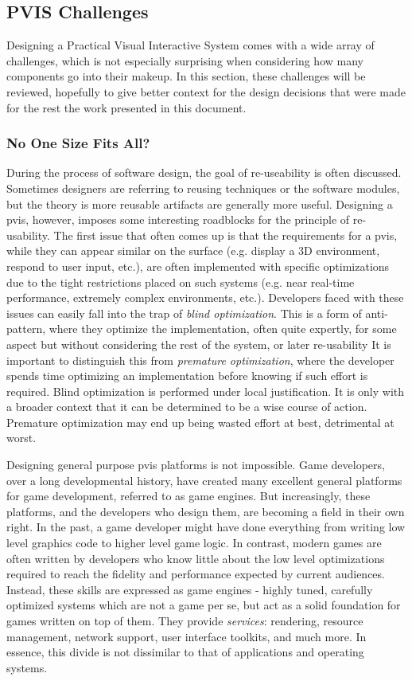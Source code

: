 \documentclass[12pt,oneside,letterpaper]{memoir}
\begin{document}
\subsection{PVIS Challenges}

Designing a Practical Visual Interactive System comes with a wide
array of challenges, which is not especially surprising when
considering how many components go into their makeup. In this section,
these challenges will be reviewed, hopefully to give better context
for the design decisions that were made for the rest the work
presented in this document.

\subsubsection{No One Size Fits All?}

During the process of software design, the goal of re-useability is
often discussed. Sometimes designers are referring to reusing
techniques or the software modules, but the theory is more reusable
artifacts are generally more useful. Designing a \gls{pvis}, however,
imposes some interesting roadblocks for the principle of
re-usability. The first issue that often comes up is that the
requirements for a \gls{pvis}, while they can appear similar on the
surface (e.g. display a 3D environment, respond to user input, etc.),
are often implemented with specific optimizations due to the tight
restrictions placed on such systems (e.g. near real-time performance,
extremely complex environments, etc.). Developers faced with these
issues can easily fall into the trap of \textit{blind
  optimization}. This is a form of anti-pattern, where they optimize
the implementation, often quite expertly, for some aspect but without
considering the rest of the system, or later re-usability It is
important to distinguish this from \textit{premature optimization},
where the developer spends time optimizing an implementation before
knowing if such effort is required. Blind optimization is performed
under local justification. It is only with a broader context that it
can be determined to be a wise course of action. Premature
optimization may end up being wasted effort at best, detrimental at
worst.

Designing general purpose \gls{pvis} platforms is not impossible. Game
developers, over a long developmental history, have created many
excellent general platforms for game development, referred to as game
engines. But increasingly, these platforms, and the developers who
design them, are becoming a field in their own right.  In the past, a
game developer might have done everything from writing low level
graphics code to higher level game logic. In contrast, modern games
are often written by developers who know little about the low level
optimizations required to reach the fidelity and performance expected
by current audiences. Instead, these skills are expressed as game
engines - highly tuned, carefully optimized systems which are not a
game per se, but act as a solid foundation for games written on top of
them. They provide \textit{services}: rendering, resource management,
network support, user interface toolkits, and much more. In essence,
this divide is not dissimilar to that of applications and operating
systems.
\end{document}
